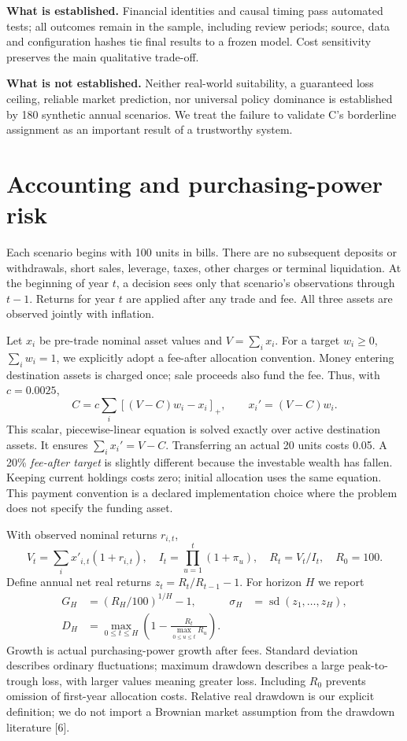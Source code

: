 \documentclass[11pt,a4paper]{article}
\begin{document}
\textbf{What is established.} Financial identities and causal timing pass
automated tests; all outcomes remain in the sample, including review periods;
source, data and configuration hashes tie final results to a frozen model.
Cost sensitivity preserves the main qualitative trade-off.

\textbf{What is not established.} Neither real-world suitability, a guaranteed
loss ceiling, reliable market prediction, nor universal policy dominance is
established by 180 synthetic annual scenarios. We treat the failure to validate
C's borderline assignment as an important result of a trustworthy system.

\newpage
\section{Accounting and purchasing-power risk}
Each scenario begins with 100 units in bills. There are no subsequent deposits
or withdrawals, short sales, leverage, taxes, other charges or terminal
liquidation. At the beginning of year $t$, a decision sees only that scenario's
observations through $t-1$. Returns for year $t$ are applied after any trade and
fee. All three assets are observed jointly with inflation.

Let $x_i$ be pre-trade nominal asset values and $V=\sum_i x_i$. For a target
$w_i\geq0$, $\sum_iw_i=1$, we explicitly adopt a fee-after allocation convention.
Money entering destination assets is charged once; sale proceeds also fund the
fee. Thus, with $c=0.0025$,
\begin{equation}
 C=c\sum_i[(V-C)w_i-x_i]_+,\qquad x_i'=(V-C)w_i.
\end{equation}
This scalar, piecewise-linear equation is solved exactly over active
destination assets. It ensures $\sum_i x_i'=V-C$. Transferring an actual 20
units costs 0.05. A 20\% \emph{fee-after target} is slightly different because
the investable wealth has fallen. Keeping current holdings costs zero; initial
allocation uses the same equation. This payment convention is a declared
implementation choice where the problem does not specify the funding asset.

With observed nominal returns $r_{i,t}$,
\begin{equation}
 V_t=\sum_i x'_{i,t}(1+r_{i,t}),\quad
 I_t=\prod_{u=1}^{t}(1+\pi_u),\quad R_t=V_t/I_t,\quad R_0=100.
\end{equation}
Define annual net real returns $z_t=R_t/R_{t-1}-1$. For horizon $H$ we report
\begin{align}
 G_H&=(R_H/100)^{1/H}-1, &
 \sigma_H&=\operatorname{sd}(z_1,\ldots,z_H),\\
 D_H&=\max_{0\leq t\leq H}\left(1-\frac{R_t}{\max_{0\leq u\leq t}R_u}\right).
\end{align}
Growth is actual purchasing-power growth after fees. Standard deviation
describes ordinary fluctuations; maximum drawdown describes a large
peak-to-trough loss, with larger values meaning greater loss. Including $R_0$
prevents omission of first-year allocation costs. Relative real drawdown is our
explicit definition; we do not import a Brownian market assumption from the
drawdown literature [6].
\end{document}
